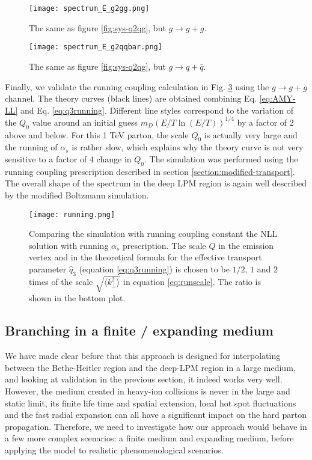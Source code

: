 \begin{figure}
\centering
\texttt{[image: spectrum\_E\_g2gg.png]}
\caption{The same as figure \ref{fig:sys-q2qg}, but $g \rightarrow g + g$.}
\label{fig:sys-g2gg}
\end{figure}

\begin{figure}
\centering
\texttt{[image: spectrum\_E\_g2qqbar.png]}
\caption{The same as figure \ref{fig:sys-q2qg}, but $g \rightarrow q + \bar{q}$.}
\label{fig:sys-g2qqbar}
\end{figure}

Finally, we validate the running coupling calculation in Fig. \ref{fig:running} using the $g\rightarrow g+g$ channel.
The theory curves (black lines) are obtained combining Eq. \ref{eq:AMY-LL} and Eq. \ref{eq:q3running}.
Different line styles correspond to the variation of the $Q_0$ value around an initial guess $m_D (E/T \ln(E/T) )^{1/4}$ by a factor of $2$ above and below.
For this 1 TeV parton, the scale $Q_0$ is actually very large and the running of $\alpha_s$ is rather slow, which explains why the theory curve is not very sensitive to a factor of $4$ change in $Q_0$.
The simulation was performed using the running coupling prescription described in section \ref{section:modified-transport}.
The overall shape of the spectrum in the deep LPM region is again well described by the modified Boltzmann simulation. 

\begin{figure}
\centering
\texttt{[image: running.png]}
\caption{Comparing the simulation with running coupling constant the NLL solution with running $\alpha_s$ prescription.
The scale $Q$ in the emission vertex and in the theoretical formula for the effective transport parameter $\hat{q}_3$ (equation \ref{eq:q3running}) is chosen to be $1/2$, $1$ and $2$ times of the scale $\sqrt{\langle k_\perp^2\rangle}$ in equation \ref{eq:runscale}.
The ratio is shown in the bottom plot.}
\label{fig:running}
\end{figure}

\subsection{Branching in a finite / expanding medium}
We have made clear before that this approach is designed for interpolating between the Bethe-Heitler region and the deep-LPM region in a large medium, and looking at validation in the previous section, it indeed works very well.
However, the medium created in heavy-ion collisions is never in the large and static limit, its finite life time and spatial extension, local hot spot fluctuations and the fast radial expansion can all have a significant impact on the hard parton propagation. 
Therefore, we need to investigate how our approach would behave in a few more complex scenarios: a finite medium and expanding medium, before applying the model to realistic phenomenological scenarios.


